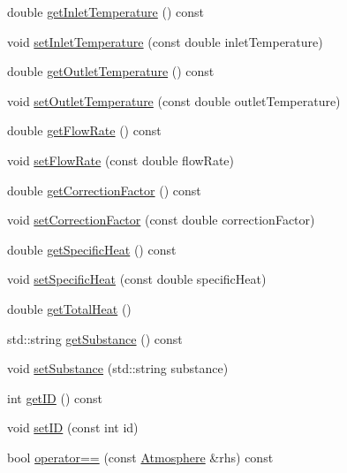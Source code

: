 \begin{DoxyCompactItemize}
\item 
double \hyperlink{class_atmosphere_acb944a3a99cd40f0132713ce73e6ca4a}{get\+Inlet\+Temperature} () const
\item 
void \hyperlink{class_atmosphere_a592bf7f82ea518fbd9da86d8f10cbc5c}{set\+Inlet\+Temperature} (const double inlet\+Temperature)
\item 
double \hyperlink{class_atmosphere_a717e2dc78ebd13420f8f26707374dd3f}{get\+Outlet\+Temperature} () const
\item 
void \hyperlink{class_atmosphere_a8f6589ab4e17d3c531bb7e0e771f4f80}{set\+Outlet\+Temperature} (const double outlet\+Temperature)
\item 
double \hyperlink{class_atmosphere_ad34708b12c8c9af4fce47669d68ebf4d}{get\+Flow\+Rate} () const
\item 
void \hyperlink{class_atmosphere_a9ff0b718c810aec0bb101336db69fd22}{set\+Flow\+Rate} (const double flow\+Rate)
\item 
double \hyperlink{class_atmosphere_a79c94343c7b6659b2f79688a1ba69aed}{get\+Correction\+Factor} () const
\item 
void \hyperlink{class_atmosphere_a86fab4b05de35c9a2b1a3a7e5ab70779}{set\+Correction\+Factor} (const double correction\+Factor)
\item 
double \hyperlink{class_atmosphere_a59802a10861a58ab0f0f4e0ab8671e14}{get\+Specific\+Heat} () const
\item 
void \hyperlink{class_atmosphere_a17450de3bc7a64b2736b1fe8785410cd}{set\+Specific\+Heat} (const double specific\+Heat)
\item 
double \hyperlink{class_atmosphere_ad3dd28020262aee76d374cbfb7998e46}{get\+Total\+Heat} ()
\item 
std\+::string \hyperlink{class_atmosphere_a3ac0fb0d4fc92edc690e44b40b7018c2}{get\+Substance} () const
\item 
void \hyperlink{class_atmosphere_aa92f55a1f07304f3e57fdfb8ece65d82}{set\+Substance} (std\+::string substance)
\item 
int \hyperlink{class_atmosphere_a73b921f4d29a4a409488cbdb56c53ff7}{get\+ID} () const
\item 
void \hyperlink{class_atmosphere_a4698bf2580f7c24c8e0617d6455bfcac}{set\+ID} (const int id)
\item 
\mbox{\label{class_atmosphere_a6bddf411a91af4808f52cd69033a5c54}} 
bool \hyperlink{class_atmosphere_a6bddf411a91af4808f52cd69033a5c54}{operator==} (const \hyperlink{class_atmosphere}{Atmosphere} \&rhs) const

\end{DoxyCompactItemize}
